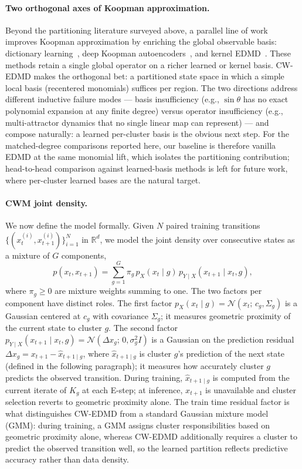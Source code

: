 \documentclass{article}
\begin{document}
\paragraph{Two orthogonal axes of Koopman approximation.} Beyond the partitioning literature surveyed above, a parallel line of work improves Koopman approximation by enriching the global observable basis: dictionary learning~\citep{li2017dictionary}, deep Koopman autoencoders~\citep{lusch2018deep,takeishi2017koopman,yeung2019deep}, and kernel EDMD~\citep{williams2015kernel}. These methods retain a single global operator on a richer learned or kernel basis. CW-EDMD makes the orthogonal bet: a partitioned state space in which a simple local basis (recentered monomials) suffices per region. The two directions address different inductive failure modes --- basis insufficiency (e.g., $\sin\theta$ has no exact polynomial expansion at any finite degree) versus operator insufficiency (e.g., multi-attractor dynamics that no single linear map can represent) --- and compose naturally: a learned per-cluster basis is the obvious next step. For the matched-degree comparisons reported here, our baseline is therefore vanilla EDMD at the same monomial lift, which isolates the partitioning contribution; head-to-head comparison against learned-basis methods is left for future work, where per-cluster learned bases are the natural target.

\paragraph{CWM joint density.} We now define the model formally. Given $N$ paired training transitions $\{(x_t^{(i)}, x_{t+1}^{(i)})\}_{i=1}^{N}$ in $\mathbb{R}^d$, we model the joint density over consecutive states as a mixture of $G$ components,
\[
p(x_t, x_{t+1}) = \sum_{g=1}^{G} \pi_g\, p_X(x_t \mid g)\, p_{Y\mid X}(x_{t+1} \mid x_t, g),
\]
where $\pi_g \geq 0$ are mixture weights summing to one. The two factors per component have distinct roles. The first factor $p_X(x_t \mid g) = \mathcal{N}(x_t;\, c_g, \Sigma_g)$ is a Gaussian centered at $c_g$ with covariance $\Sigma_g$; it measures geometric proximity of the current state to cluster $g$. The second factor $p_{Y\mid X}(x_{t+1} \mid x_t, g) = \mathcal{N}(\Delta x_g;\, 0, \sigma_g^2 I)$ is a Gaussian on the prediction residual $\Delta x_g = x_{t+1} - \hat{x}_{t+1\mid g}$, where $\hat{x}_{t+1\mid g}$ is cluster $g$'s prediction of the next state (defined in the following paragraph); it measures how accurately cluster $g$ predicts the observed transition. During training, $\hat{x}_{t+1\mid g}$ is computed from the current iterate of $K_g$ at each E-step; at inference, $x_{t+1}$ is unavailable and cluster selection reverts to geometric proximity alone. The train time residual factor is what distinguishes CW-EDMD from a standard Gaussian mixture model (GMM): during training, a GMM assigns cluster responsibilities based on geometric proximity alone, whereas CW-EDMD additionally requires a cluster to predict the observed transition well, so the learned partition reflects predictive accuracy rather than data density.
\end{document}
